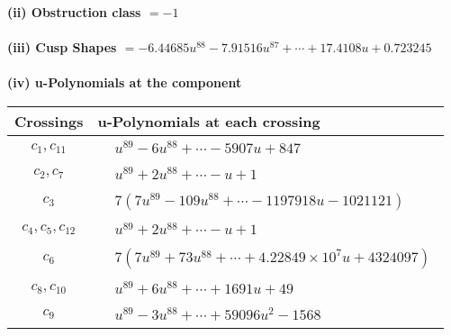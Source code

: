 \documentclass[1p]{elsarticle_modified}
\theoremstyle{definition}
\begin{document}
\flushleft \textbf{(ii) Obstruction class $= -1$}\\~\\
\flushleft \textbf{(iii) Cusp Shapes $= -6.44685 u^{88}-7.91516 u^{87}+\cdots+17.4108 u+0.723245$}\\~\\
\newpage\renewcommand{\arraystretch}{1}
\flushleft \textbf{(iv) u-Polynomials at the component}\newline \\
\begin{tabular}{m{50pt}|m{274pt}}
Crossings & \hspace{64pt}u-Polynomials at each crossing \\
\hline $$\begin{aligned}c_{1},c_{11}\end{aligned}$$&$\begin{aligned}
&u^{89}-6 u^{88}+\cdots-5907 u+847
\end{aligned}$\\
\hline $$\begin{aligned}c_{2},c_{7}\end{aligned}$$&$\begin{aligned}
&u^{89}+2 u^{88}+\cdots- u+1
\end{aligned}$\\
\hline $$\begin{aligned}c_{3}\end{aligned}$$&$\begin{aligned}
&7(7 u^{89}-109 u^{88}+\cdots-1197918 u-1021121)
\end{aligned}$\\
\hline $$\begin{aligned}c_{4},c_{5},c_{12}\end{aligned}$$&$\begin{aligned}
&u^{89}+2 u^{88}+\cdots- u+1
\end{aligned}$\\
\hline $$\begin{aligned}c_{6}\end{aligned}$$&$\begin{aligned}
&7(7 u^{89}+73 u^{88}+\cdots+4.22849\times10^{7} u+4324097)
\end{aligned}$\\
\hline $$\begin{aligned}c_{8},c_{10}\end{aligned}$$&$\begin{aligned}
&u^{89}+6 u^{88}+\cdots+1691 u+49
\end{aligned}$\\
\hline $$\begin{aligned}c_{9}\end{aligned}$$&$\begin{aligned}
&u^{89}-3 u^{88}+\cdots+59096 u^2-1568
\end{aligned}$\\
\hline
\end{tabular}\\~\\
\end{document}
